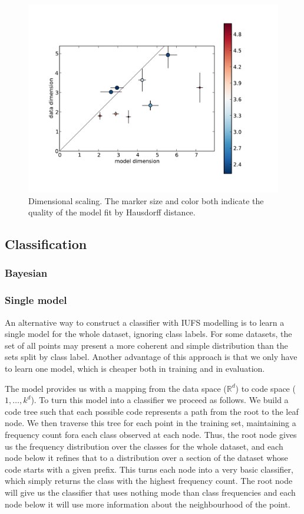 \documentclass[10pt]{article}
\theoremstyle{definition}
\begin{document}
\begin{figure}[htb]
\centering
\includegraphics[width=\textwidth]{../img/out-table.pdf}
\caption{Dimensional scaling. The marker size and color both indicate the quality of the model fit by Hausdorff distance. }
\label{fig:dim_scale}
\end{figure}


\subsection{Classification}

\subsubsection{Bayesian}

\subsubsection{Single model}

An alternative way to construct a classifier with IUFS modelling is to learn a single model for the whole dataset, ignoring class labels. For some datasets, the set of all points may present a more coherent and simple distribution than the sets split by class label. Another advantage of this approach is that we only have to learn one model, which is cheaper both in training and in evaluation.

The model provides us with a mapping from the data space (${\mathbb R}^d$) to code space (${1, \ldots, k}^d$). To turn this model into a classifier we proceed as follows. We build a code tree such that each possible code represents a path from the root to the leaf node. We then traverse this tree for each point in the training set, maintaining a frequency count fora each class observed at each node. Thus, the root node gives us the frequency distribution over the classes for the whole dataset, and each node below it refines that to a distribution over a section of the dataset whose code starts with a given prefix. This turns each node into a very basic classifier, which simply returns the class with the highest frequency count. The root node will give us the classifier that uses nothing mode than class frequencies and each node below it will use more information about the neighbourhood of the point.
\end{document}

